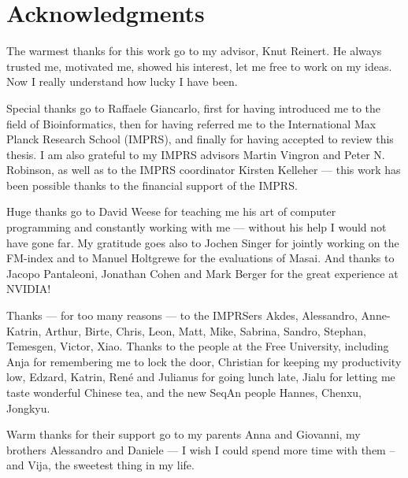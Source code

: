 \section*{Acknowledgments}
\label{sec::acknowlegments}

The warmest thanks for this work go to my advisor, Knut Reinert.
He always trusted me, motivated me, showed his interest, let me free to work on my ideas. %
Now I really understand how lucky I have been.

Special thanks go to Raffaele Giancarlo, first for having introduced me to the field of Bioinformatics, then for having referred me to the International Max Planck Research School (IMPRS), and finally for having accepted to review this thesis.
I am also grateful to my IMPRS advisors Martin Vingron and Peter N. Robinson, as well as to the IMPRS coordinator Kirsten Kelleher ---
this work has been possible thanks to the financial support of the IMPRS.

Huge thanks go to David Weese for teaching me his art of computer programming and constantly working with me --- without his help I would not have gone far.
My gratitude goes also to Jochen Singer for jointly working on the FM-index and to Manuel Holtgrewe for the evaluations of Masai.
And thanks to Jacopo Pantaleoni, Jonathan Cohen and Mark Berger for the great experience at NVIDIA!

Thanks --- for too many reasons --- to the IMPRSers Akdes, Alessandro, Anne-Katrin, Arthur, Birte, Chris, Leon, Matt, Mike, Sabrina, Sandro, Stephan, Temesgen, Victor, Xiao.
Thanks to the people at the Free University, including Anja for remembering me to lock the door, Christian for keeping my productivity low, Edzard, Katrin, Ren\'e and Julianus for going lunch late, Jialu for letting me taste wonderful Chinese tea, and the new SeqAn people Hannes, Chenxu, Jongkyu.

Warm thanks for their support go to my parents Anna and Giovanni, my brothers Alessandro and Daniele --- I wish I could spend more time with them -- and Vija, the sweetest thing in my life.
